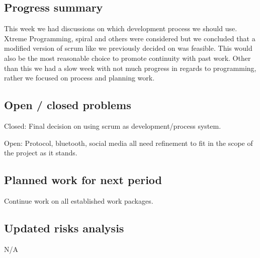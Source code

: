 \subsection{Progress summary}
This week we had discussions on which development process we should use. Xtreme Programming, spiral and others were considered but we concluded that a modified version of scrum like we previously decided on was feasible. This would also be the most reasonable choice to promote continuity with past work. Other than this we had a slow week with not much progress in regards to programming, rather we focused on process and planning work.

\subsection{Open / closed problems}
Closed: Final decision on using scrum as development/process system. 

Open:
Protocol, bluetooth, social media all need refinement to fit in the scope of the project as it stands.


\subsection{Planned work for next period}
Continue work on all established work packages.

\subsection{Updated risks analysis}
N/A